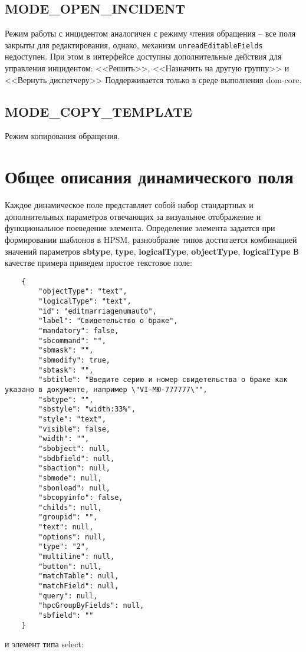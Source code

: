 \documentclass[../index.tex]{subfiles}
\begin{document}
\subsection{MODE\_OPEN\_INCIDENT}
Режим работы с инцидентом аналогичен с режиму чтения обращения -- все поля закрыты для редактирования, однако, механизм \verb|unreadEditableFields| недоступен. При этом в интерфейсе доступны дополнительные действия для управления инцидентом: <<Решить>>,  <<Назначить на другую группу>> и <<Вернуть диспетчеру>>
Поддерживается только в среде выполнения dom-core.

\subsection{MODE\_COPY\_TEMPLATE}
Режим копирования обращения.
\section{Общее описания динамического поля}
	Каждое динамическое поле представляет собой набор стандартных и дополнительных параметров отвечающих за визуальное отображение и функциональное поеведение элемента.
	Определение элемента задается при формировании шаблонов в HPSM, разнообразие типов достигается комбинацией значений параметров \textbf{sbtype}, \textbf{type}, \textbf{logicalType}, \textbf{objectType}, \textbf{logicalType}
	В качестве примера приведем простое текстовое поле:
\begin{verbatim}
	{
		"objectType": "text",
		"logicalType": "text",
		"id": "editmarriagenumauto",
		"label": "Свидетельство о браке",
		"mandatory": false,
		"sbcommand": "",
		"sbmask": "",
		"sbmodify": true,
		"sbtask": "",
		"sbtitle": "Введите серию и номер свидетельства о браке как указано в документе, например \"VI-МЮ-777777\"",
		"sbtype": "",
		"sbstyle": "width:33%",
		"style": "text",
		"visible": false,
		"width": "",
		"sbobject": null,
		"sbdbfield": null,
		"sbaction": null,
		"sbmode": null,
		"sbonload": null,
		"sbcopyinfo": false,
		"childs": null,
		"groupid": "",
		"text": null,
		"options": null,
		"type": "2",
		"multiline": null,
		"button": null,
		"matchTable": null,
		"matchField": null,
		"query": null,
		"hpcGroupByFields": null,
		"sbfield": ""
	}
\end{verbatim}
	и элемент типа select:
\end{document}
